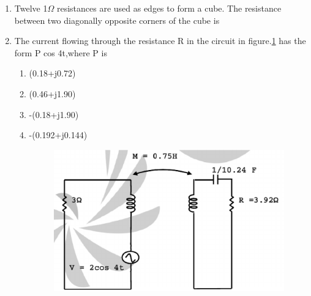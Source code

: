 \documentclass[journal,12pt,twocolumn]{IEEEtran}
\begin{document}
\begin{enumerate}
\item Twelve 1$\Omega$ resistances are used as edges to form a cube. The resistance between two diagonally opposite corners of the cube is
\begin{enumerate}
\setlength\itemsep{2em}
\end{enumerate}

\item The current flowing through the resistance R in the circuit in figure.\ref{fig49} has the form
P cos 4t,where P is
\begin{enumerate}
\setlength\itemsep{2em}
\item (0.18+j0.72)
\item (0.46+j1.90)
\item -(0.18+j1.90)
\item -(0.192+j0.144)

\begin{figure}[!h]
\begin{center}
\includegraphics[scale=0.5]{./figs/fig49.eps}
\caption{}
\label{fig49}
\end{center}
\end{figure}
\end{enumerate}


\end{enumerate}
\end{document}
